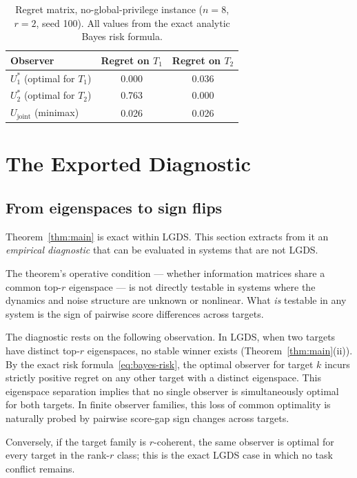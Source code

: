 \documentclass[11pt]{article}
\begin{document}
\begin{table}[t]
\centering
\caption{Regret matrix, no-global-privilege instance ($n=8$, $r=2$,
seed 100). All values from the exact analytic Bayes risk formula.}
\label{tab:regret}
\begin{tabular}{lcc}
\toprule
Observer & Regret on $T_1$ & Regret on $T_2$ \\
\midrule
$U^*_1$ (optimal for $T_1$) & 0.000 & 0.036 \\
$U^*_2$ (optimal for $T_2$) & 0.763 & 0.000 \\
$U_{\mathrm{joint}}$ (minimax) & 0.026 & 0.026 \\
\bottomrule
\end{tabular}
\end{table}


\section{The Exported Diagnostic}
\label{sec:diagnostic}

\subsection{From eigenspaces to sign flips}

Theorem~\ref{thm:main} is exact within LGDS.
This section extracts from it an \emph{empirical diagnostic} that can be
evaluated in systems that are not LGDS.

The theorem's operative condition --- whether information matrices share a
common top-$r$ eigenspace --- is not directly testable in systems where the
dynamics and noise structure are unknown or nonlinear.
What \emph{is} testable in any system is the sign of pairwise score
differences across targets.

The diagnostic rests on the following observation.
In LGDS, when two targets have distinct top-$r$ eigenspaces, no stable
winner exists (Theorem~\ref{thm:main}(ii)).
By the exact risk formula~\eqref{eq:bayes-risk}, the optimal observer for
target $k$ incurs strictly positive regret on any other target with a
distinct eigenspace.
This eigenspace separation implies that no single observer is simultaneously
optimal for both targets.
In finite observer families, this loss of common optimality is naturally
probed by pairwise score-gap sign changes across targets.

Conversely, if the target family is $r$-coherent, the same observer is
optimal for every target in the rank-$r$ class;
this is the exact LGDS case in which no task conflict remains.
\end{document}
